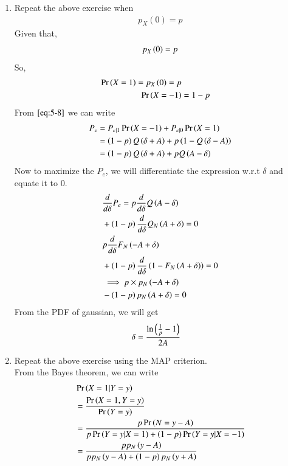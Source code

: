 \documentclass[journal,12pt,twocolumn]{IEEEtran}
\renewcommand\thesection{\arabic{section}}
\begin{document}
\begin{enumerate}[label=\thesection.\arabic*,ref=\thesection.\theenumi]
\begin{enumerate}[label=\thesection.\arabic*
,ref=\thesection.\theenumi]
\item Repeat the above exercise when
	\begin{align}
		p_{X}(0) = p
	\end{align}
 \solution Given that,
         \begin{align}
		 p_{X}\left(0\right) = p
         \end{align}
	 So,
	 \begin{align}
           \Pr\left(X = 1\right) = p_{X}\left(0\right) = p\\
           \Pr\left(X = -1\right) &= 1 - p
         \end{align}		 
   From $\eqref{eq:5-8}$ we can write
         \begin{align}
             P_e &= P_{e|1}\Pr\left(X = -1\right) + P_{e|0}\Pr\left(X=1\right) \\
		 &= \left(1-p\right)Q\left(\delta + A\right) + p\left(1 - Q\left(\delta - A\right)\right)\\
		 &= \left(1-p\right)Q\left(\delta + A\right) + pQ\left(A - \delta\right)
         \end{align}
   Now to maximize the $P_e$, we will differentiate the expression w.r.t $\delta$ and equate it to $0$.
         \begin{align}
          &\frac{d}{d\delta}P_e=p\frac{d}{d\delta} Q\left(A -\delta\right)\nonumber \\
          &+\left(1-p\right)\frac{d}{d\delta} Q_N\left(A+\delta\right)=0\\
          &p\frac{d}{d\delta} F_N\left(-A+\delta\right)\nonumber \\
          &+\left(1-p\right)\frac{d}{d\delta}\left(1-F_N\left(A+\delta\right)\right)=0\\
          &\implies p\times p_N\left(-A+\delta\right)\\
          &-\left(1-p\right)p_N\left(A+\delta\right)=0
         \end{align}     
  From the PDF of gaussian, we will get
         \begin{align}
		 \delta &= \frac{\ln\left(\frac{1}{p} - 1\right)}{2A}
         \end{align}
\item Repeat the above exercise using the MAP criterion.\\
  \solution From the Bayes theorem, we can write
       \begin{align}
	          &\pr{X=1|Y=y}  \\
	          &= \frac{\pr{X=1,Y=y}}{\pr{Y=y}}\\
		      &= \frac{p\pr{N = y -A}}{p\pr{Y=y|X=1} +\brak{1-p}\pr{Y=y|X=-1}}\\
		      &= \frac{p p_{N}\brak{y-A}}{pp_{N}\brak{y-A} + \brak{1-p}p_{N}\brak{y+A}}\\

\end{align}
\end{enumerate}
\end{enumerate}
\end{document}
